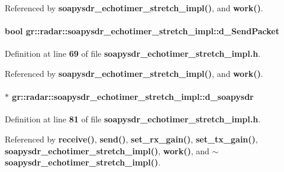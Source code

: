 Referenced by {\bf soapysdr\+\_\+echotimer\+\_\+stretch\+\_\+impl()}, and {\bf work()}.

\paragraph[{d\+\_\+\+Send\+Packet}]{\setlength{\rightskip}{0pt plus 5cm}bool gr\+::radar\+::soapysdr\+\_\+echotimer\+\_\+stretch\+\_\+impl\+::d\+\_\+\+Send\+Packet\hspace{0.3cm}{\ttfamily [private]}}\label{classgr_1_1radar_1_1soapysdr__echotimer__stretch__impl_aa671256120b35a8ff0f5d823e5abfa80}


Definition at line {\bf 69} of file {\bf soapysdr\+\_\+echotimer\+\_\+stretch\+\_\+impl.\+h}.



Referenced by {\bf soapysdr\+\_\+echotimer\+\_\+stretch\+\_\+impl()}, and {\bf work()}.

\paragraph[{d\+\_\+soapysdr}]{ $\ast$ gr\+::radar\+::soapysdr\+\_\+echotimer\+\_\+stretch\+\_\+impl\+::d\+\_\+soapysdr\hspace{0.3cm}{\ttfamily [private]}}\label{classgr_1_1radar_1_1soapysdr__echotimer__stretch__impl_a128f2e7a73d063d55493c5f3ada3e461}


Definition at line {\bf 81} of file {\bf soapysdr\+\_\+echotimer\+\_\+stretch\+\_\+impl.\+h}.



Referenced by {\bf receive()}, {\bf send()}, {\bf set\+\_\+rx\+\_\+gain()}, {\bf set\+\_\+tx\+\_\+gain()}, {\bf soapysdr\+\_\+echotimer\+\_\+stretch\+\_\+impl()}, {\bf work()}, and {\bf $\sim$soapysdr\+\_\+echotimer\+\_\+stretch\+\_\+impl()}.

